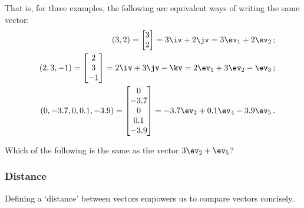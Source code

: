 That is, for three examples, the following are equivalent ways of writing the same vector:
\begin{eqnarray*}&&
(3,2)=\begin{bmatrix} 3\\2 \end{bmatrix}=3\iv+2\jv=3\ev_1+2\ev_2\,;
\\&&
(2,3,-1)=\begin{bmatrix} 2\\3\\-1 \end{bmatrix}
=2\iv+3\jv-\kv=2\ev_1+3\ev_2-\ev_3\,;
\\&&
(0,-3.7,0,0.1,-3.9)
=\begin{bmatrix} 0\\-3.7\\0\\0.1\\-3.9 \end{bmatrix}
=-3.7\ev_2+0.1\ev_4-3.9\ev_5\,.
\end{eqnarray*}




\begin{activity}
Which of the following is the same as the vector \(3\ev_2+\ev_5\)?
\end{activity}




\subsubsection{Distance}
Defining a `distance' between vectors empowers us to compare vectors concisely.

